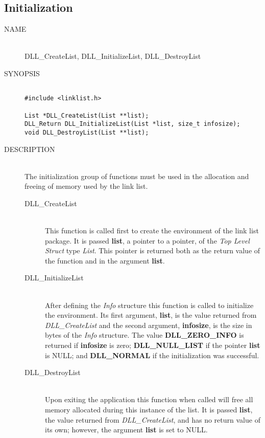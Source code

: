 \documentclass[10pt,letterpaper,titlepage]{article}
\begin{document}
\subsection{Initialization}
\begin{description}
\item[NAME]\quad\\
DLL\_CreateList, DLL\_InitializeList, DLL\_DestroyList

\item[SYNOPSIS]
\begin{verbatim}

#include <linklist.h>

List *DLL_CreateList(List **list);
DLL_Return DLL_InitializeList(List *list, size_t infosize);
void DLL_DestroyList(List **list);
\end{verbatim}

\item[DESCRIPTION]\quad\\
The initialization group of functions must be used in the allocation and freeing of memory used by the link list.

\begin{description}
\item[DLL\_CreateList]\quad\\
 This function is called first to create the environment of the link list package.  It is passed \textbf{list}, a pointer to a pointer, of the \emph{Top Level Struct} type \emph{List}.  This pointer is returned both as the return value of the function and in the argument \textbf{list}.

\item[DLL\_InitializeList]\quad\\
 After defining the \emph{Info} structure this function is called to initialize the environment.  Its first argument, \textbf{list}, is the value returned from \emph{DLL\_CreateList} and the second argument, \textbf{infosize}, is the size in bytes of the \emph{Info} structure.  The value \textbf{DLL\_ZERO\_INFO} is returned if \textbf{infosize} is zero; \textbf{DLL\_NULL\_LIST} if the pointer \textbf{list} is NULL; and \textbf{DLL\_NORMAL} if the initialization was successful.

\item[DLL\_DestroyList]\quad\\
 Upon exiting the application this function when called will free all memory allocated during this instance of the list.  It is passed \textbf{list}, the value returned from \emph{DLL\_CreateList}, and has no return value of its own; however, the argument \textbf{list} is set to NULL.
\end{description}


\end{description}
\end{document}
